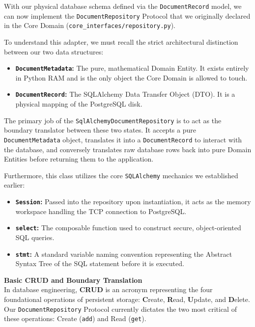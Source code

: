 With our physical database schema defined via the \texttt{DocumentRecord} model, we can now implement the \texttt{DocumentRepository} Protocol that we originally declared in the Core Domain (\texttt{core\_interfaces/repository.py}).

To understand this adapter, we must recall the strict architectural distinction between our two data structures:
\begin{itemize}
    \item \textbf{\texttt{DocumentMetadata}:} The pure, mathematical Domain Entity. It exists entirely in Python RAM and is the only object the Core Domain is allowed to touch.
    \item \textbf{\texttt{DocumentRecord}:} The SQLAlchemy Data Transfer Object (DTO). It is a physical mapping of the PostgreSQL disk.
\end{itemize}

The primary job of the \texttt{SqlAlchemyDocumentRepository} is to act as the boundary translator between these two states. It accepts a pure \texttt{DocumentMetadata} object, translates it into a \texttt{DocumentRecord} to interact with the database, and conversely translates raw database rows back into pure Domain Entities before returning them to the application.

Furthermore, this class utilizes the core \texttt{SQLAlchemy} mechanics we established earlier:
\begin{itemize}
    \item \textbf{\texttt{Session}:} Passed into the repository upon instantiation, it acts as the memory workspace handling the TCP connection to PostgreSQL.
    \item \textbf{\texttt{select}:} The composable function used to construct secure, object-oriented SQL queries.
    \item \textbf{\texttt{stmt}:} A standard variable naming convention representing the Abstract Syntax Tree of the SQL statement before it is executed.
\end{itemize}

\textbf{Basic CRUD and Boundary Translation} \\
In database engineering, \textbf{CRUD} is an acronym representing the four foundational operations of persistent storage: \textbf{C}reate, \textbf{R}ead, \textbf{U}pdate, and \textbf{D}elete. Our \texttt{DocumentRepository} Protocol currently dictates the two most critical of these operations: Create (\texttt{add}) and Read (\texttt{get}).

